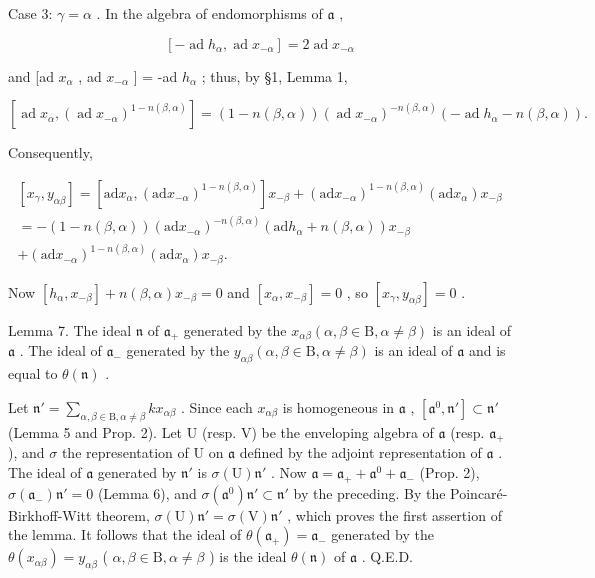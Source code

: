 Case 3: \(\gamma = \alpha\) . In the algebra of endomorphisms of \(\mathfrak{a}\) ,

\[
[ - \operatorname{ad} h _ {\alpha}, \operatorname{ad} x _ {- \alpha} ] = 2 \operatorname{ad} x _ {- \alpha}
\]

and {[}ad \(x_{\alpha}\) , ad \(x_{-\alpha}\) {]} = -ad \(h_{\alpha}\) ; thus, by §1, Lemma 1,

\[
[ \operatorname{ad} x _ {\alpha}, (\operatorname{ad} x _ {- \alpha}) ^ {1 - n (\beta , \alpha)} ] = (1 - n (\beta , \alpha)) (\operatorname{ad} x _ {- \alpha}) ^ {- n (\beta , \alpha)} (- \operatorname{ad} h _ {\alpha} - n (\beta , \alpha)).
\]

Consequently,

\[
\begin{array}{c} [ x _ {\gamma}, y _ {\alpha \beta} ] = [ \text {ad} x _ {\alpha}, (\text {ad} x _ {- \alpha}) ^ {1 - n (\beta , \alpha)} ] x _ {- \beta} + (\text {ad} x _ {- \alpha}) ^ {1 - n (\beta , \alpha)} (\text {ad} x _ {\alpha}) x _ {- \beta} \\ = - (1 - n (\beta , \alpha)) (\text {ad} x _ {- \alpha}) ^ {- n (\beta , \alpha)} (\text {ad} h _ {\alpha} + n (\beta , \alpha)) x _ {- \beta} \\ + (\text {ad} x _ {- \alpha}) ^ {1 - n (\beta , \alpha)} (\text {ad} x _ {\alpha}) x _ {- \beta}. \end{array}
\]

Now \([h_{\alpha},x_{-\beta}] + n(\beta ,\alpha)x_{-\beta} = 0\) and \([x_{\alpha},x_{-\beta}] = 0\) , so \([x_{\gamma},y_{\alpha \beta}] = 0\) .

Lemma 7. The ideal \(\mathfrak{n}\) of \(\mathfrak{a}_{+}\) generated by the \(x_{\alpha \beta} (\alpha, \beta \in \mathrm{B}, \alpha \neq \beta)\) is an ideal of \(\mathfrak{a}\) . The ideal of \(\mathfrak{a}_{-}\) generated by the \(y_{\alpha \beta} (\alpha, \beta \in \mathrm{B}, \alpha \neq \beta)\) is an ideal of \(\mathfrak{a}\) and is equal to \(\theta(\mathfrak{n})\) .

Let \(\mathfrak{n}' = \sum_{\alpha, \beta \in \mathrm{B}, \alpha \neq \beta} kx_{\alpha \beta}\) . Since each \(x_{\alpha \beta}\) is homogeneous in \(\mathfrak{a}\) , \([\mathfrak{a}^0, \mathfrak{n}'] \subset \mathfrak{n}'\) (Lemma 5 and Prop. 2). Let U (resp. V) be the enveloping algebra of \(\mathfrak{a}\) (resp. \(\mathfrak{a}_+\) ), and \(\sigma\) the representation of U on \(\mathfrak{a}\) defined by the adjoint representation of \(\mathfrak{a}\) . The ideal of \(\mathfrak{a}\) generated by \(\mathfrak{n}'\) is \(\sigma(\mathrm{U})\mathfrak{n}'\) . Now \(\mathfrak{a} = \mathfrak{a}_+ + \mathfrak{a}^0 + \mathfrak{a}_-\) (Prop. 2), \(\sigma(\mathfrak{a}_-)\mathfrak{n}' = 0\) (Lemma 6), and \(\sigma(\mathfrak{a}^0)\mathfrak{n}' \subset \mathfrak{n}'\) by the preceding. By the Poincaré-Birkhoff-Witt theorem, \(\sigma(\mathrm{U})\mathfrak{n}' = \sigma(\mathrm{V})\mathfrak{n}'\) , which proves the first assertion of the lemma. It follows that the ideal of \(\theta(\mathfrak{a}_+) = \mathfrak{a}_-\) generated by the \(\theta(x_{\alpha \beta}) = y_{\alpha \beta}\) ( \(\alpha, \beta \in \mathrm{B}, \alpha \neq \beta\) ) is the ideal \(\theta(\mathfrak{n})\) of \(\mathfrak{a}\) . Q.E.D.

